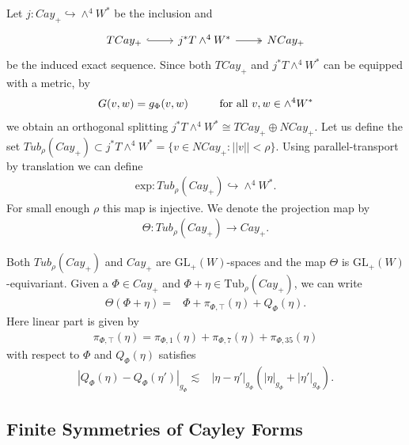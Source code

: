 \documentclass[psamsfonts]{amsart}
\theoremstyle{plain}
\theoremstyle{definition}{
\newtheorem{defi}{Definition}[section]
\newtheorem{ass}{Assumption}
\newtheorem*{nota}{Notation}}
\theoremstyle{remark}{
\newtheorem{rem}{Remark}
\newtheorem{ex}{Example}}
\theoremstyle{plain}{
\newtheorem{thm}{Theorem}[section]
\newtheorem{lem}{Lemma}[section]
\newtheorem{cor}{Corollary}[section]
\newtheorem{prop}{Proposition}[section]
\newtheorem{con}{Conjecture}[section]}
\newcommand{\m}[1]{{\mathrm{#1}}}
\begin{document}
Let $j\colon Cay_+\hookrightarrow \wedge^4W^*$ be the inclusion and 
\begin{equation*}
    \begin{tikzcd}
            TCay_+\arrow[r,hook]&j^*T\wedge^4W^*\arrow[r,two heads]&NCay_+
    \end{tikzcd}
\end{equation*}
be the induced exact sequence. Since both $TCay_+$ and $j^*T\wedge^4W^*$ can be equipped with a metric, by 
\begin{align*}
    G(v,w)=g_\Phi(v,w)\hspace{1.0cm}\text{for all }v,w\in\wedge^4W^*
\end{align*}
we obtain an orthogonal splitting $j^*T\wedge^4W^*\cong TCay_+\oplus NCay_+$. Let us define the set $Tub_\rho(Cay_+)\subset j^*T\wedge^4W^*=\{v\in NCay_+ \colon\left|\left|v\right|\right|<\rho\}$. Using parallel-transport by translation we can define 
\begin{align*}
    \m{exp}: Tub_\rho(Cay_+)\hookrightarrow\wedge^4W^*.
\end{align*}
For small enough $\rho$ this map is injective. We denote the projection map by 
\begin{align*}
    \Theta:Tub_\rho(Cay_+)\rightarrow Cay_+.
\end{align*}

\begin{lem}\cite[Prop. 10.5.9]{joyce2000compact}
\label{C0Festimateslem}
Both $Tub_\rho(Cay_+)$ and $Cay_+$ are $\m{GL}_+(W)$-spaces and the map $\Theta$ is $\m{GL}_+(W)$-equivariant. Given a $\Phi\in Cay_+$ and $\Phi+\eta\in\m{Tub}_\rho(Cay_+)$, we can write 
\begin{align}
\label{C0Festimates}
    \Theta(\Phi+\eta)=&\Phi+\pi_{\Phi,\top}(\eta)+Q_{\Phi}(\eta).
\end{align}
Here linear part is given by 
\begin{align*}
    \pi_{\Phi,\top}(\eta)=\pi_{\Phi,1}(\eta)+\pi_{\Phi,7}(\eta)+\pi_{\Phi,35}(\eta)
\end{align*}
with respect to $\Phi$ and $Q_\Phi(\eta)$ satisfies 
\begin{align*}
    |Q_\Phi(\eta)-Q_\Phi(\eta')|_{g_\Phi}\lesssim&|\eta-\eta'|_{g_\Phi}\left(|\eta|_{g_\Phi}+|\eta'|_{g_\Phi}\right).
\end{align*}
\end{lem}



\subsection{Finite Symmetries of Cayley Forms}
\label{Finite Symmetries of Cayley Forms}
\end{document}
